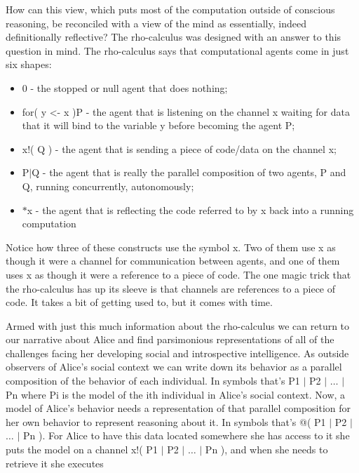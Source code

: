 \documentclass[10pt]{report}
\begin{document}
\vspace{1\baselineskip}
How can this view, which puts most of the computation outside of conscious reasoning, be reconciled with a view of the mind as essentially, indeed definitionally reflective? The rho-calculus was designed with an answer to this question in mind. The rho-calculus says that computational agents come in just six shapes:

\vspace{1\baselineskip}
\begin{itemize}
	\item 0 - the stopped or null agent that does nothing;

	\item for( y <- x )P - the agent that is listening on the channel x waiting for data that it will bind to the variable y before becoming the agent P;

	\item x!( Q ) - the agent that is sending a piece of code/data on the channel x;

	\item P$\vert$Q - the agent that is really the parallel composition of two agents, P and Q, running concurrently, autonomously;

	\item $\ast$x - the agent that is reflecting the code referred to by x back into a running computation

\end{itemize}
\vspace{1\baselineskip}
Notice how three of these constructs use the symbol x. Two of them use x as though it were a channel for communication between agents, and one of them uses x as though it were a reference to a piece of code. The one magic trick that the rho-calculus has up its sleeve is that channels are references to a piece of code. It takes a bit of getting used to, but it comes with time.

\vspace{1\baselineskip}
Armed with just this much information about the rho-calculus we can return to our narrative about Alice and find parsimonious representations of all of the challenges facing her developing social and introspective intelligence. As outside observers of Alice’s social context we can write down its behavior as a parallel composition of the behavior of each individual. In symbols that’s P1 $\vert$ P2 $\vert$ $\ldots$ $\vert$ Pn where Pi is the model of the ith individual in Alice’s social context. Now, a model of Alice’s behavior needs a representation of that parallel composition for her own behavior to represent reasoning about it. In symbols that’s @( P1 $\vert$ P2 $\vert$ $\ldots$ $\vert$ Pn ). For Alice to have this data located somewhere she has access to it she puts the model on a channel x!( P1 $\vert$ P2 $\vert$ $\ldots$ $\vert$ Pn ), and when she needs to retrieve it she executes
\end{document}
